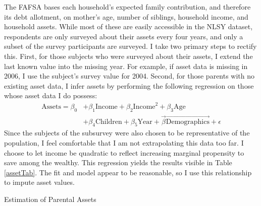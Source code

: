 \documentclass[12pt]{article}
\begin{document}
	The FAFSA bases each household's expected family contribution, and therefore its debt allotment, on mother's age, number of siblings, household income, and household assets. While most of these are easily accessible in the NLSY dataset, respondents are only surveyed about their assets every four years, and only a subset of the survey participants are surveyed. I take two primary steps to rectify this. First, for those subjects who were surveyed about their assets, I extend the last known value into the missing year. For example, if asset data is missing in 2006, I use the subject's survey value for 2004. Second, for those parents with no existing asset data, I infer assets by performing the following regression on those whose asset data I do possess: 
	\begin{equation}
	\begin{aligned}
	\mbox{Assets} = \beta_0 &+ \beta_1 \mbox{Income} + \beta_2 \mbox{Income}^2 + \beta_3 \mbox{Age} \\
	&+ \beta_4 \mbox{Children} + \beta_5 \mbox{Year} + \vec{\beta} \vec{\mbox{Demographics}} + \epsilon
	\end{aligned}
	\end{equation}
	Since the subjects of the subsurvey were also chosen to be representative of the population, I feel comfortable that I am not extrapolating this data too far. I choose to let income be quadratic to reflect increasing marginal propensity to save among the wealthy. This regression yields the results visible in Table \ref{assetTab}. The fit and model appear to be reasonable, so I use this relationship to impute asset values.
	
	\begin{table}
		\centering
		\caption{Estimation of Parental Assets}
		
		\label{assetTab}
	\end{table}
\end{document}
